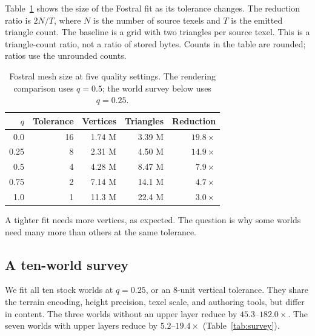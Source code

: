 \documentclass{jcgt}
\begin{document}
Table~\ref{tab:fit-quality} shows the size of the Fostral fit as its tolerance changes. The reduction ratio is $2N/T$, where $N$ is the number of source texels and $T$ is the emitted triangle count. The baseline is a grid with two triangles per source texel. This is a triangle-count ratio, not a ratio of stored bytes. Counts in the table are rounded; ratios use the unrounded counts.

\begin{table}[tbp]\centering\small
\caption{Fostral mesh size at five quality settings. The rendering comparison uses $q=0.5$; the world survey below uses $q=0.25$.}\label{tab:fit-quality}
\begin{tabular}{@{}rrrrr@{}}
\toprule
$q$ & Tolerance & Vertices & Triangles & Reduction \\
\midrule
0.0 & 16 & 1.74 M & 3.39 M & $19.8\times$ \\
0.25 & 8 & 2.31 M & 4.50 M & $14.9\times$ \\
0.5 & 4 & 4.28 M & 8.47 M & $7.9\times$ \\
0.75 & 2 & 7.14 M & 14.1 M & $4.7\times$ \\
1.0 & 1 & 11.3 M & 22.4 M & $3.0\times$ \\
\bottomrule
\end{tabular}
\end{table}

A tighter fit needs more vertices, as expected. The question is why some worlds need many more than others at the same tolerance.

\subsection{A ten-world survey}\label{sec:survey}

We fit all ten stock worlds at $q=0.25$, or an 8-unit vertical tolerance. They share the terrain encoding, height precision, texel scale, and authoring tools, but differ in content. The three worlds without an upper layer reduce by $45.3$--$182.0\times$. The seven worlds with upper layers reduce by $5.2$--$19.4\times$ (Table~\ref{tab:survey}).
\end{document}
